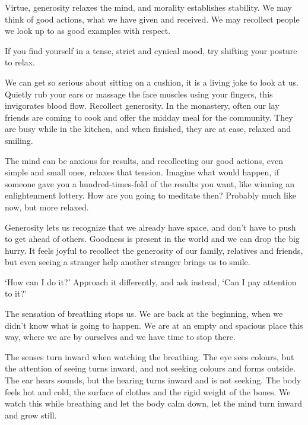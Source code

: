 Virtue, generosity relaxes the mind, and morality establishes stability.
We may think of good actions, what we have given and received. We may
recollect people we look up to as good examples with respect.

If you find yourself in a tense, strict and cynical mood, try shifting
your posture to relax.

We can get so serious about sitting on a cushion, it is a living joke to
look at us. Quietly rub your ears or massage the face muscles using your
fingers, this invigorates blood flow. Recollect generosity. In the
monastery, often our lay friends are coming to cook and offer the midday
meal for the community. They are busy while in the kitchen, and when
finished, they are at ease, relaxed and smiling.

The mind can be anxious for results, and recollecting our good actions,
even simple and small ones, relaxes that tension. Imagine what would
happen, if someone gave you a hundred-times-fold of the results you
want, like winning an enlightenment lottery. How are you going to
meditate then? Probably much like now, but more relaxed.

Generosity lets us recognize that we already have space, and don't have
to push to get ahead of others. Goodness is present in the world and we
can drop the big hurry. It feels joyful to recollect the generosity of
our family, relatives and friends, but even seeing a stranger help
another stranger brings us to smile.


`How can I do it?' Approach it differently, and ask instead, `Can I pay
attention to it?'

The sensation of breathing stops us. We are back at the beginning, when
we didn't know what is going to happen. We are at an empty and spacious
place this way, where we are by ourselves and we have time to stop
there.

The senses turn inward when watching the breathing. The eye sees
colours, but the attention of seeing turns inward, and not seeking
colours and forms outside. The ear hears sounds, but the hearing turns
inward and is not seeking. The body feels hot and cold, the surface of
clothes and the rigid weight of the bones. We watch this while breathing
and let the body calm down, let the mind turn inward and grow still.


